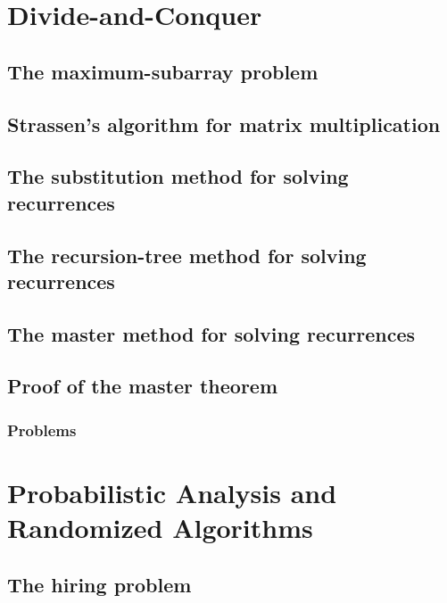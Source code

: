 \documentclass[fontsize=12pt,paper=a4,open=any]{book}
\begin{document}
\begin{enumerate}
{\begin{enumerate}
\begin{tabular}{c c c c c c}
				\end{tabular}
				
			\end{enumerate}
		}
	
\end{enumerate}


\chapter{Divide-and-Conquer}

\section{The maximum-subarray problem}

\section{Strassen’s algorithm for matrix multiplication}

\section{The substitution method for solving recurrences}

\section{The recursion-tree method for solving recurrences}

\section{The master method for solving recurrences}

\section{Proof of the master theorem}

\subsection*{Problems}


\chapter{Probabilistic Analysis and Randomized Algorithms}

\section{The hiring problem}
\end{document}
